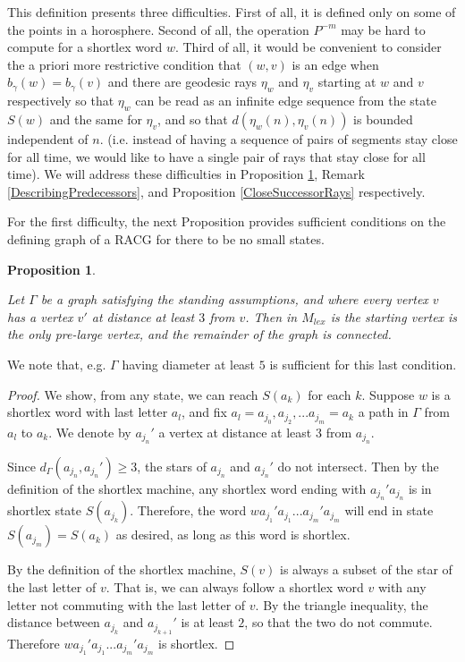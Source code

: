 \documentclass{amsart}
\newtheorem{proposition}[theorem]{Proposition}
\theoremstyle{definition}
\theoremstyle{remark}
\begin{document}
	This definition presents three difficulties. First of all, it is defined only on some of the points in a horosphere. Second of all, the operation $P^{-m}$ may be hard to compute for a shortlex word $w$. Third of all, it would be convenient to consider the a priori more restrictive condition that $(w,v)$ is an edge when $b_\gamma(w)=b_\gamma(v)$ and there are geodesic rays $\eta_w$ and $\eta_v$ starting at $w$ and $v$ respectively so that $\eta_w$ can be read as an infinite edge sequence from the state $S(w)$ and the same for $\eta_v$, and so that $d(\eta_w(n),\eta_v(n))$ is bounded independent of $n$. (i.e. instead of having a sequence of pairs of segments stay close for all time, we would like to have a single pair of rays that stay close for all time). We will address these difficulties in Proposition \ref{EveryStateLarge}, Remark \ref{DescribingPredecessors}, and Proposition \ref{CloseSuccessorRays} respectively.
	
	For the first difficulty, the next Proposition provides sufficient conditions on the defining graph of a RACG for there to be no small states.
	
	\begin{proposition} \label{EveryStateLarge}
		
		Let $\Gamma$ be a graph satisfying the standing assumptions, and where every vertex $v$ has a vertex $v'$ at distance at least $3$ from $v$. Then in $M_{lex}$ is the starting vertex is the only pre-large vertex, and the remainder of the graph is connected.
		
	\end{proposition}
	
	We note that, e.g. $\Gamma$ having diameter at least $5$ is sufficient for this last condition. 
	
	\begin{proof}
		
		We show, from any state, we can reach $S(a_k)$ for each $k$. Suppose $w$ is a shortlex word with last letter $a_l$, and fix $a_l=a_{j_0}, a_{j_2}, ...a_{j_m}=a_k$ a path in $\Gamma$ from $a_l$ to $a_k$. We denote by $a_{j_n}'$ a vertex at distance at least $3$ from $a_{j_n}$.
		
		Since $d_\Gamma(a_{j_n}, a_{j_n}')\ge 3$, the stars of $a_{j_n}$ and $a_{j_n}'$ do not intersect. Then by the definition of the shortlex machine, any shortlex word ending with $a_{j_n}'a_{j_n}$ is in shortlex state $S(a_{j_k})$. Therefore, the word $wa_{j_1}'a_{j_1}...a_{j_m}'a_{j_m}$ will end in state $S(a_{j_m})=S(a_k)$ as desired, as long as this word is shortlex.
		
		By the definition of the shortlex machine, $S(v)$ is always a subset of the star of the last letter of $v$. That is, we can always follow a shortlex word $v$ with any letter not commuting with the last letter of $v$. By the triangle inequality, the distance between $a_{j_k}$ and $a_{j_{k+1}}'$ is at least $2$, so that the two do not commute. Therefore $wa_{j_1}'a_{j_1}...a_{j_m}'a_{j_m}$ is shortlex.
		\end{proof}
	
\end{document}
